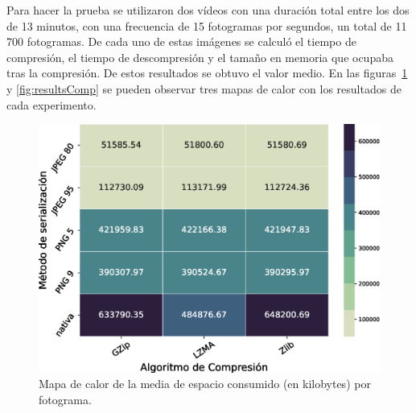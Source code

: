 Para hacer la prueba se utilizaron dos vídeos con una duración total entre los dos de 13 minutos, con una frecuencia de 15 fotogramas por segundos, un total de 11\,700 fotogramas. De cada uno de estas imágenes se calculó el tiempo de compresión, el tiempo de descompresión y el tamaño en memoria que ocupaba tras la compresión. De estos resultados se obtuvo el valor medio. En las figuras~\ref{fig:heatmapmemory} y \ref{fig:resultsComp} se pueden observar tres mapas de calor con los resultados de cada experimento.

\begin{figure}[h]
	\centering
	\includegraphics[width=\textwidth]{img/MemoriaMedia.eps}
	\caption{Mapa de calor de la media de espacio consumido (en kilobytes) por fotograma.}
	\label{fig:heatmapmemory}
\end{figure}

